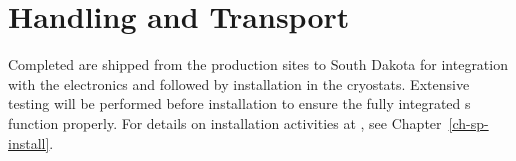 \section{ Handling and Transport} %
\label{sec:fdsp-apa-transport}

Completed  are shipped from the  production sites to South Dakota for integration with the   electronics and  followed by installation in the  cryostats.  %
Extensive  testing will be performed before installation to ensure the fully integrated s function properly.  %
For details on installation activities at \surf, see Chapter~\ref{ch-sp-install}. %




